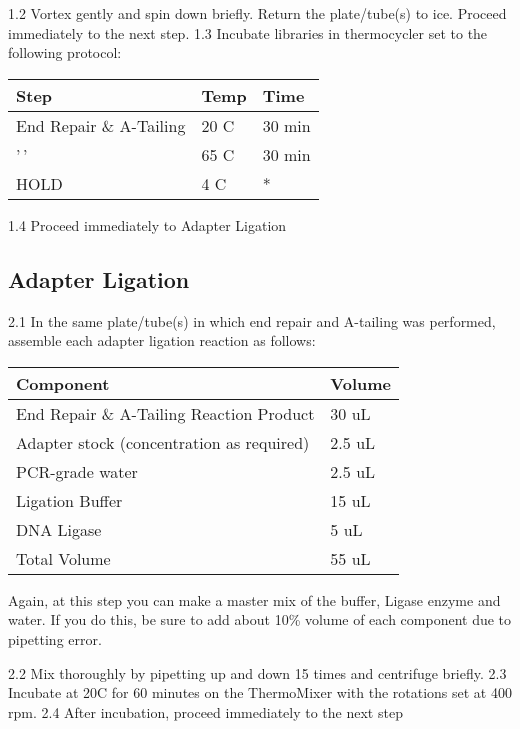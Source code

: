 \documentclass[
  letterpaper,
  DIV=11,
  numbers=noendperiod]{scrreprt}
\begin{document}
1.2 Vortex gently and spin down briefly. Return the plate/tube(s) to
ice. Proceed immediately to the next step. 1.3 Incubate libraries in
thermocycler set to the following protocol:

\begin{longtable}[]{@{}lll@{}}
\toprule()
\textbf{Step} & \textbf{Temp} & \textbf{Time} \\
\midrule()
\endhead
End Repair \& A-Tailing & 20 C & 30 min \\
'\,' & 65 C & 30 min \\
HOLD & 4 C & * \\
\bottomrule()
\end{longtable}

1.4 Proceed immediately to Adapter Ligation

\hypertarget{adapter-ligation}{%
\subsection*{\texorpdfstring{\textbf{Adapter
Ligation}}{Adapter Ligation}}\label{adapter-ligation}}

2.1 In the same plate/tube(s) in which end repair and A-tailing was
performed, assemble each adapter ligation reaction as follows:

\begin{longtable}[]{@{}ll@{}}
\toprule()
\textbf{Component} & \textbf{Volume} \\
\midrule()
\endhead
End Repair \& A-Tailing Reaction Product & 30 uL \\
Adapter stock (concentration as required) & 2.5 uL \\
PCR-grade water & 2.5 uL \\
Ligation Buffer & 15 uL \\
DNA Ligase & 5 uL \\
Total Volume & 55 uL \\
\bottomrule()
\end{longtable}

Again, at this step you can make a master mix of the buffer, Ligase
enzyme and water. If you do this, be sure to add about 10\% volume of
each component due to pipetting error.

2.2 Mix thoroughly by pipetting up and down 15 times and centrifuge
briefly. 2.3 Incubate at 20C for 60 minutes on the ThermoMixer with the
rotations set at 400 rpm. 2.4 After incubation, proceed immediately to
the next step
\end{document}
